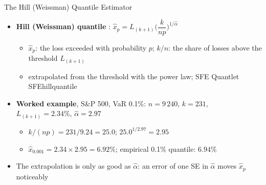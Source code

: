 \begin{frame}{The Hill (Weissman) Quantile Estimator}
\itemsize{\small}
\begin{itemize}
    \item \textbf{Hill (Weissman) quantile} : $\hat x_p = L_{(k+1)}\Big(\dfrac{k}{n p}\Big)^{1/\hat\alpha}$
    \begin{itemize}
        \item $\hat x_p$: the loss exceeded with probability $p$; $k/n$: the share of losses above the threshold $L_{(k+1)}$
        \item extrapolated from the threshold with the power law; SFE Quantlet SFEhillquantile
    \end{itemize}
    \item \textbf{Worked example}, S\&P 500, VaR 0.1\%: $n = 9\,240$, $k = 231$, $L_{(k+1)} = 2.34\%$, $\hat\alpha = 2.97$
    \begin{itemize}
        \item $k/(np) = 231/9.24 = 25.0$; $25.0^{1/2.97} = 2.95$
        \item $\hat x_{0.001} = 2.34 \times 2.95 = 6.92\%$; empirical 0.1\% quantile: $6.94\%$
    \end{itemize}
    \item The extrapolation is only as good as $\hat\alpha$: an error of one SE in $\hat\alpha$ moves $\hat x_p$ noticeably
\end{itemize}
\end{frame}

